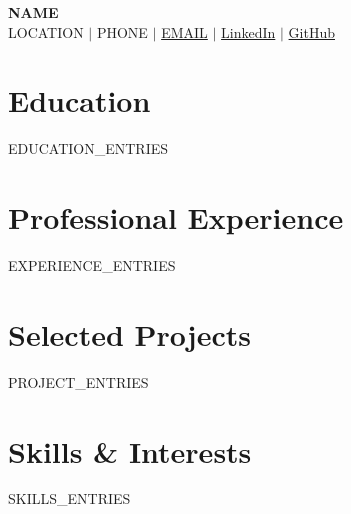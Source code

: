 \documentclass[letterpaper,11pt]{article}
\newcommand{\resumeSubHeadingListStart}{\begin{itemize}[leftmargin=0in, label={}]}
\newcommand{\resumeSubHeadingListEnd}{\end{itemize}}
\newcommand{\resumeItemListStart}{\begin{itemize}[leftmargin=0.15in]}
\newcommand{\resumeItemListEnd}{\end{itemize}\vspace{-5pt}}
\begin{document}
\begin{center}
    {\LARGE \bfseries {{NAME}} } \\[4pt]
    \small {{LOCATION}} $|$
    {{PHONE}} $|$
    \href{mailto:{{EMAIL}}}{{{EMAIL}}} $|$
    \href{{{LINKEDIN_URL}}}{LinkedIn} $|$
    \href{{{GITHUB_URL}}}{GitHub}
\end{center}

\section{Education}
\resumeSubHeadingListStart
  {{EDUCATION_ENTRIES}}
\resumeSubHeadingListEnd

\section{Professional Experience}
\resumeSubHeadingListStart
  {{EXPERIENCE_ENTRIES}}
\resumeSubHeadingListEnd

\section{Selected Projects}
\resumeSubHeadingListStart
  {{PROJECT_ENTRIES}}
\resumeSubHeadingListEnd

\section{Skills \& Interests}
\resumeItemListStart
  {{SKILLS_ENTRIES}}
\resumeItemListEnd
\end{document}
